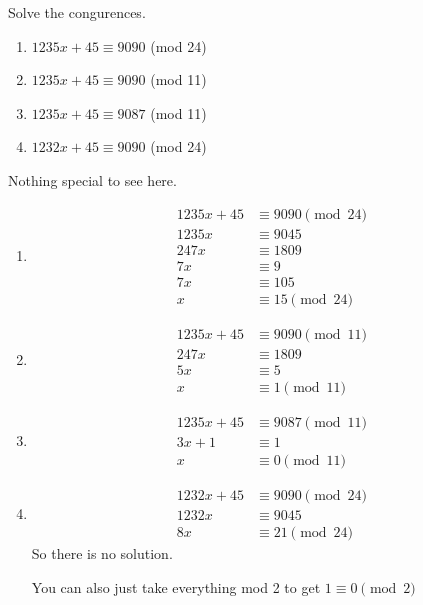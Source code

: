 \documentclass{scrartcl}
\begin{document}
\begin{exercise}
	Solve the congurences.
	\begin{enumerate}
		\item $1235x + 45 \equiv 9090$ (mod 24)
		\item $1235x + 45 \equiv 9090$ (mod 11)
		\item $1235x + 45 \equiv 9087$ (mod 11)
		\item $1232x + 45 \equiv 9090$ (mod 24)
	\end{enumerate}
	\begin{soln} Nothing special to see here. 
		\begin{enumerate}

			\item 
				\begin{align*}
					1235x + 45 &\equiv 9090 \pmod{24} \\
					1235x &\equiv 9045 \\
					247x &\equiv 1809 \\
					7x &\equiv 9 \\
					7x &\equiv 105 \\ 
					x &\equiv 15 \pmod{24}
				\end{align*}
			\item 
				\begin{align*}
					1235x + 45 &\equiv 9090 \pmod{11} \\
					247x &\equiv 1809  \\
					5x &\equiv 5  \\
					x &\equiv 1 \pmod{11}
				\end{align*}
			\item 
				\begin{align*}
					1235x + 45 &\equiv 9087 \pmod{11} \\
					3x + 1 &\equiv 1 \\
					x &\equiv 0 \pmod{11}
				\end{align*}
			\item 
				\begin{align*}
					1232x + 45 &\equiv 9090 \pmod{24} \\
					1232x &\equiv 9045 \\
					8x &\equiv 21 \pmod{24}
				\end{align*}
				So there is no solution.
			\begin{remark*}
				You can also just take everything mod 2 to get $1 \equiv 0 \pmod{2}$
			\end{remark*}
		\end{enumerate}
	\end{soln}
\end{exercise}
\end{document}
